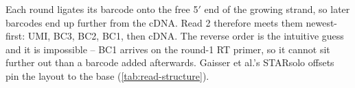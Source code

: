  Each round ligates its barcode onto
the free 5$'$ end of the growing strand, so later barcodes end up further from the
cDNA. Read 2 therefore meets them newest-first: UMI, BC3, BC2, BC1, then cDNA. The
reverse order is the intuitive guess and it is impossible -- BC1 arrives on the
round-1 RT primer, so it cannot sit further out than a barcode added afterwards.
Gaisser et al.'s STARsolo
offsets~\citep{gaisserHighthroughputSinglecellTranscriptomics2024} pin the layout
to the base (\cref{tab:read-structure}).

